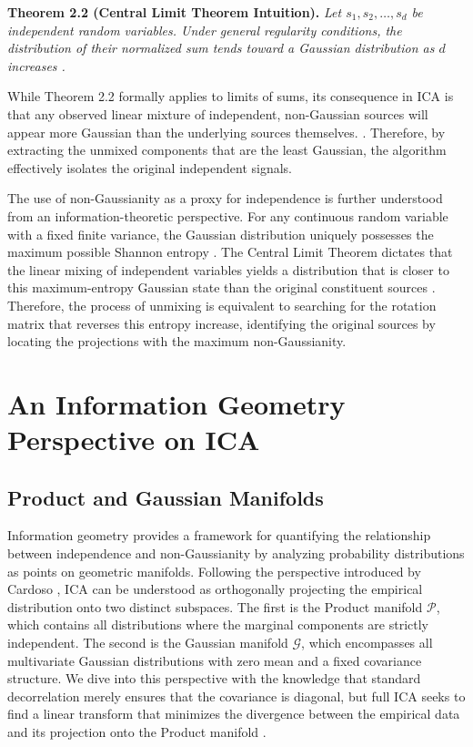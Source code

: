 \documentclass[12pt,a4paper,twoside,openany]{book}
\begin{document}
\vspace{0.5em}
\noindent\textbf{Theorem 2.2 (Central Limit Theorem Intuition).} \textit{Let $s_1, s_2, \dots, s_d$ be independent random variables. 
Under general regularity conditions, the distribution of their normalized sum tends toward a Gaussian distribution as $d$ increases \cite{billingsley1995probability}.}
\vspace{0.5em}

While Theorem 2.2 formally applies to limits of sums, its consequence in ICA is that any observed 
linear mixture of independent, non-Gaussian sources will appear more Gaussian than the underlying sources themselves. \cite[Chapter 1]{hyvarinen2001}.
Therefore, by extracting the unmixed components that are the least Gaussian, the algorithm effectively isolates the original independent signals.

The use of non-Gaussianity as a proxy for independence is further understood from an information-theoretic perspective. 
For any continuous random variable with a fixed finite variance, the Gaussian distribution uniquely possesses the maximum 
possible Shannon entropy \cite[Chapter 8]{cover2006elements}. The Central Limit Theorem dictates that the linear mixing of 
independent variables yields a distribution that is closer to this maximum-entropy Gaussian state than the original 
constituent sources \cite[Chapter 8]{hyvarinen2001}. Therefore, the process of unmixing is equivalent to searching for the rotation 
matrix that reverses this entropy increase, identifying the original sources by locating the projections 
with the maximum non-Gaussianity.

\section{An Information Geometry Perspective on ICA}

\subsection{Product and Gaussian Manifolds}
Information geometry provides a framework for quantifying the relationship between independence and non-Gaussianity 
by analyzing probability distributions as points on geometric manifolds. 
Following the perspective introduced by Cardoso \citeyear{cardoso2022}, ICA can be understood as orthogonally projecting 
the empirical distribution onto two distinct subspaces. The first is the Product manifold $\mathcal{P}$, 
which contains all distributions where the marginal components are strictly independent. The second is the 
Gaussian manifold $\mathcal{G}$, which encompasses all multivariate Gaussian distributions with zero mean and a fixed covariance structure. 
We dive into this perspective with the knowledge that standard decorrelation merely ensures that the covariance is diagonal, but full ICA seeks to find a linear transform 
that minimizes the divergence between the empirical data and its projection onto the Product manifold \cite{cardoso2022}.
\end{document}
